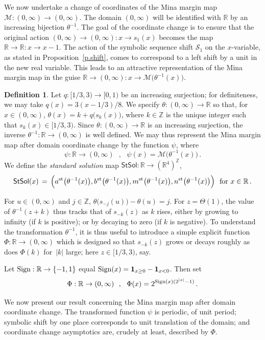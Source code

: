 \documentclass[letterpaper,11pt,oneside,reqno]{amsbook}
\newcommand{\R}{\ensuremath{\mathbb{R}}}
\newcommand{\Z}{\ensuremath{\mathbb{Z}}}
\numberwithin{figure}{chapter}
\theoremstyle{definition}
\theoremstyle{definition}
\theoremstyle{definition}
\newtheorem{definition}[theorem]{Definition}
\theoremstyle{definition}
\theoremstyle{definition}
\newcommand{\mc}{\mathcal}
\newcommand{\asta}{a^{\rm st}}
\newcommand{\bst}{b^{\rm st}}
\newcommand{\mst}{m^{\rm st}}
\newcommand{\nst}{n^{\rm st}}
\newcommand{\solution}{\mathsf{StSol}}
\newcommand{\minamm}{\mathcal{M}}
\newcommand{\PhiMac}{\Phi}
\begin{document}
We now undertake a change of coordinates of the Mina margin map $\minamm:(0,\infty) \to (0,\infty)$. The domain $(0,\infty)$
will be identified with $\R$ by an increasing bijection $\theta^{-1}$. The goal of the coordinate change is to ensure that the original action $(0,\infty) \to (0,\infty): x \to s_1(x)$ becomes the map $\R \to \R: x \to x-1$. The action of the symbolic sequence shift $\mc{S}_1$ on the $x$-variable, as stated in Proposition~\ref{p.shift}, comes to correspond to a left shift by a unit in the new real variable. This leads to an attractive representation of the Mina margin map in the guise $\R \to (0,\infty): x \to \minamm\big( \theta^{-1}(x)\big)$.
\begin{definition}
Let $q:[1/3,3) \to [0,1)$ be an increasing surjection; for definiteness, we may take $q(x) = 3(x -1/3)/8$.
We specify $\theta:(0,\infty) \to \R$ so that, for $x \in (0,\infty)$, $\theta(x) = k+q\big(s_k(x)\big)$, where $k \in \Z$ is the unique integer such that $s_k(x) \in [1/3,3)$.
Since $\theta:(0,\infty) \to \R$ is an increasing surjection, the inverse $\theta^{-1}: \R \to (0,\infty)$ is well defined. We may thus represent the Mina margin map after domain coordinate change by the function $\psi$, where  
$$
\psi: \R \to (0,\infty) \, \, \, \, , \, \, \, \, \psi(x) = \minamm \big( \theta^{-1}(x) \big) \, .
$$
We define the {\em standard solution} map $\solution:\R \to (\R^4)^\Z$,
$$
 \solution(x) \, = \, \Big( \asta\big( \theta^{-1}(x)\big), \bst\big( \theta^{-1}(x)\big), \mst\big( \theta^{-1}(x)\big), \nst\big( \theta^{-1}(x)\big)   \Big) \, \, \, \, \textrm{for $x \in \R$} \, .
$$
\end{definition}
For $u \in (0,\infty)$ and $j \in \Z$, $\theta\big(s_{-j}(u)\big) - \theta(u) = j$.
For $z = \Theta(1)$, 
the value of $\theta^{-1}(z+k)$ thus tracks that of $s_{-k}(z)$
as $k$ rises, either by growing to infinity (if $k$ is positive); or by decaying to zero (if $k$ is negative). To understand the transformation $\theta^{-1}$, it is thus useful to  introduce a simple explicit function  $\PhiMac:\R \to (0,\infty)$ which is designed so that $s_{-k}(z)$ grows or decays roughly as does $\PhiMac(k)$ for~$\vert k \vert$ large; here $z \in [1/3,3)$, say. 
  
Let $\rm Sign:\R \to \{-1,1\}$ equal ${\rm Sign}(x) = {\bf 1}_{x \geq 0} -  {\bf 1}_{x < 0}$.
Then set 
$$
\PhiMac:\R \to (0,\infty) \, \, \, \, , \, \, \, \, \PhiMac(x) = 2^{{\rm Sign}(x)(2^{\vert x \vert} -1)} \, .
$$ 


We now present our result concerning the Mina margin map after domain coordinate change. The transformed function $\psi$ is periodic, of unit period; symbolic shift by one place corresponds to unit translation of the domain; and coordinate change asymptotics are, crudely at least, described by $\PhiMac$.
\end{document}
